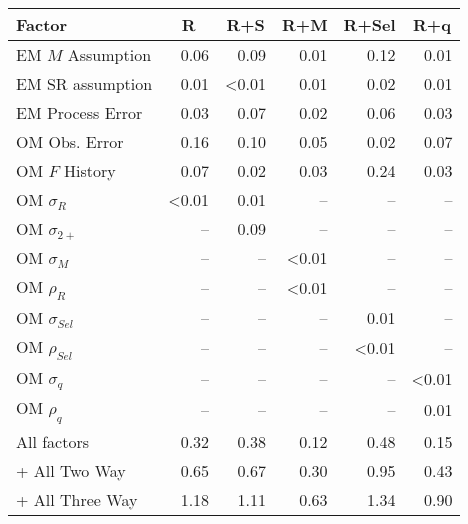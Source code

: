 \begin{center}
\begin{tabular}{lrrrrr}
\hline\hline
\multicolumn{1}{l}{Factor}&\multicolumn{1}{c}{R}&\multicolumn{1}{c}{R+S}&\multicolumn{1}{c}{R+M}&\multicolumn{1}{c}{R+Sel}&\multicolumn{1}{c}{R+q}\tabularnewline
\hline
EM $M$ Assumption&0.06&0.09&0.01&0.12&0.01\tabularnewline
EM SR assumption&0.01&\textless  0.01&0.01&0.02&0.01\tabularnewline
EM Process Error&0.03&0.07&0.02&0.06&0.03\tabularnewline
OM Obs. Error&0.16&0.10&0.05&0.02&0.07\tabularnewline
OM $F$ History&0.07&0.02&0.03&0.24&0.03\tabularnewline
OM $\sigma_R$&\textless  0.01&0.01&--&--&--\tabularnewline
OM $\sigma_{2+}$ &--&0.09&--&--&--\tabularnewline
OM $\sigma_M$&--&--&\textless  0.01&--&--\tabularnewline
OM $\rho_R$&--&--&\textless  0.01&--&--\tabularnewline
OM $\sigma_{Sel}$&--&--&--&0.01&--\tabularnewline
OM $\rho_{Sel}$&--&--&--&\textless  0.01&--\tabularnewline
OM $\sigma_q$&--&--&--&--&\textless  0.01\tabularnewline
OM $\rho_q$&--&--&--&--&0.01\tabularnewline
All factors&0.32&0.38&0.12&0.48&0.15\tabularnewline
+ All Two Way&0.65&0.67&0.30&0.95&0.43\tabularnewline
+ All Three Way&1.18&1.11&0.63&1.34&0.90\tabularnewline
\hline
\end{tabular}\end{center}
